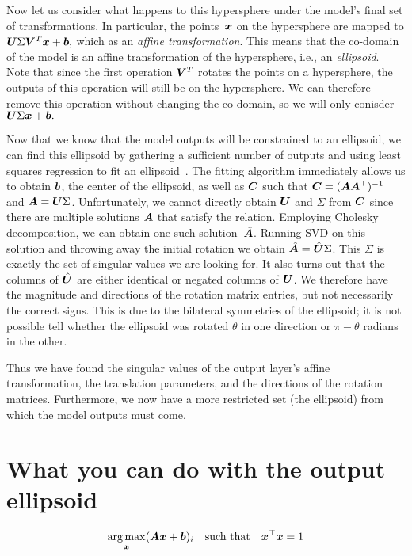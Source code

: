 \documentclass{article}
\begin{document}
Now let us consider what happens to this hypersphere under the model's final set of transformations.
In particular, the points~\({\bm{x}}\) on the hypersphere are mapped to 
\({\bm{U}}\Sigma{\bm{V}}^T{\bm{x}} + {\bm{b}},\)
which as an \emph{affine transformation}.
This means that the co-domain of the model is an affine transformation of the hypersphere, i.e., an \emph{ellipsoid}.
Note that since the first operation \({\bm{V}}^T\) rotates the points on a hypersphere,
the outputs of this operation will still be on the hypersphere.
We can therefore remove this operation without changing the co-domain, 
so we will only conisder \({\bm{U}}\Sigma{\bm{x}} + {\bm{b}}.\)

Now that we know that the model outputs will be constrained to an ellipsoid,
we can find this ellipsoid by gathering a sufficient number of outputs 
and using least squares regression to fit an ellipsoid~\cite{Bertoni2010PreprintSM}.
The fitting algorithm immediately allows us to obtain \({\bm{b}}\), the center of the ellipsoid,
as well as \({\bm{C}}\) such that \({\bm{C}}=({\bm{A}}{\bm{A}}^\top)^{-1}\) and \({\bm{A}}={\bm{U}}\Sigma\).
Unfortunately, we cannot directly obtain \({\bm{U}}\) and \(\Sigma\) from \({\bm{C}}\)
since there are multiple solutions \({\bm{A}}\) that satisfy the relation.
Employing Cholesky decomposition, 
we can obtain one such solution~\(\hat{{\bm{A}}}\).
Running SVD on this solution and throwing away the initial rotation 
we obtain \(\hat{{\bm{A}}}=\hat{{\bm{U}}}\Sigma\).
This \(\Sigma\) is exactly the set of singular values we are looking for.
It also turns out that the columns of \(\hat{{\bm{U}}}\) are either identical or negated columns of \({\bm{U}}\).
We therefore have the magnitude and directions of the rotation matrix entries, 
but not necessarily the correct signs.
This is due to the bilateral symmetries of the ellipsoid;
it is not possible tell whether the ellipsoid was rotated \(\theta\) in one direction
or \(\pi-\theta\) radians in the other.

Thus we have found the singular values of the output layer's affine transformation,
the translation parameters, and the directions of the rotation matrices.
Furthermore, we now have a more restricted set (the ellipsoid) from which the model outputs must come. 

\section{What you can do with the output ellipsoid}

\[\operatorname*{arg\,max}_{\bm{x}}({\bm{A}}{\bm{x}}+{\bm{b}})_i\quad\text{such that}\quad{\bm{x}}^\top{\bm{x}}=1 \]



\end{document}
